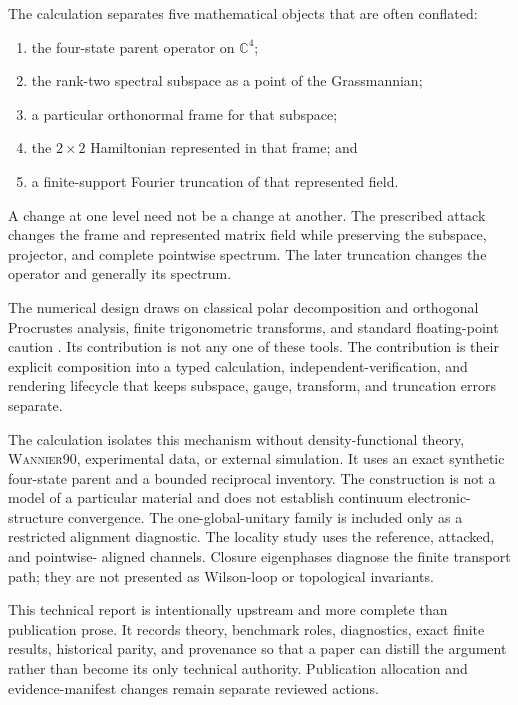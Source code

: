 \documentclass[11pt]{article}
\newcommand{\CC}{\mathbb{C}}
\begin{document}
The calculation separates five mathematical objects that are often conflated:
\begin{enumerate}
 \item the four-state parent operator on $\CC^4$;
 \item the rank-two spectral subspace as a point of the Grassmannian;
 \item a particular orthonormal frame for that subspace;
 \item the $2\times2$ Hamiltonian represented in that frame; and
 \item a finite-support Fourier truncation of that represented field.
\end{enumerate}
A change at one level need not be a change at another.  The prescribed attack changes
the frame and represented matrix field while preserving the subspace, projector, and
complete pointwise spectrum.  The later truncation changes the operator and generally
its spectrum.

The numerical design draws on classical polar decomposition and orthogonal Procrustes
analysis\cite{higham1986,schoenemann1966,golubVanLoan2013}, finite trigonometric
transforms\cite{trefethen2000}, and standard floating-point caution
\cite{higham2002}.  Its contribution is not any one of these tools.  The contribution is
their explicit composition into a typed calculation, independent-verification, and
rendering lifecycle that keeps subspace, gauge, transform, and truncation errors separate.

The calculation isolates this mechanism without density-functional theory,
\textsc{Wannier90}, experimental data, or external simulation.  It uses an exact
synthetic four-state parent and a bounded reciprocal inventory.  The construction is
not a model of a particular material and does not establish continuum electronic-
structure convergence.  The one-global-unitary family is included only as a restricted
alignment diagnostic.  The locality study uses the reference, attacked, and pointwise-
aligned channels.  Closure eigenphases diagnose the finite transport path; they are not
presented as Wilson-loop or topological invariants.

This technical report is intentionally upstream and more complete than publication
prose.  It records theory, benchmark roles, diagnostics, exact finite results,
historical parity, and provenance so that a paper can distill the argument rather than
become its only technical authority.  Publication allocation and evidence-manifest
changes remain separate reviewed actions.
\end{document}
